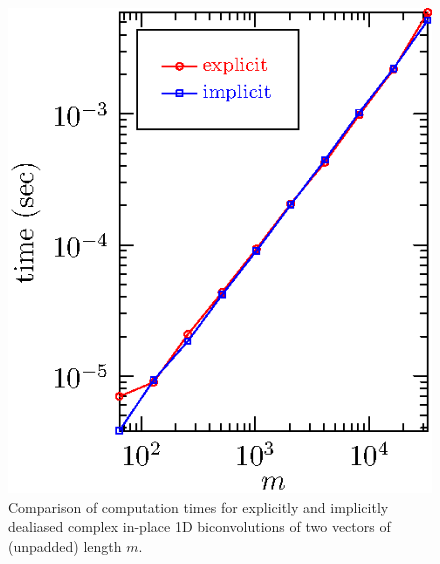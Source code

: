 \documentclass[final]{siamltex}
\begin{document}
\begin{figure}[htbp]
\begin{center}
\begin{minipage}{0.5\linewidth}
\begin{center}
\includegraphics{timing1b}
\caption{Comparison of computation times for explicitly and implicitly
dealiased complex in-place 1D biconvolutions of two vectors of
(unpadded) length $m$.}
\label{timing1b}
\end{center}
\end{minipage}
%
\begin{minipage}{0.49\linewidth}
\begin{center}

\end{center}
\end{minipage}
\end{center}
\end{figure}
\end{document}

